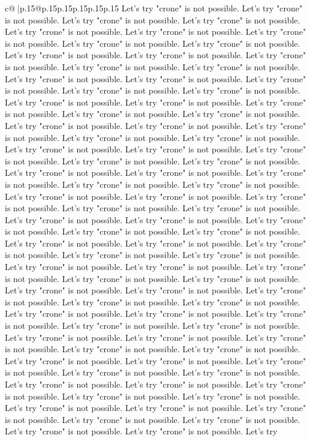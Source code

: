 \documentclass{article}
\begin{document}
{\begin{supertabular}{c@{$\;$}|p{.15\linewidth}@{}p{.15\linewidth}p{.15\linewidth}p{.15\linewidth}p{.15\linewidth}p{.15\linewidth}}
{{{Let's try "crone" is not possible. Let's try "crone" is not possible. Let's try "crone" is not possible. Let's try "crone" is not possible. Let's try "crone" is not possible. Let's try "crone" is not possible. Let's try "crone" is not possible. Let's try "crone" is not possible. Let's try "crone" is not possible. Let's try "crone" is not possible. Let's try "crone" is not possible. Let's try "crone" is not possible. Let's try "crone" is not possible. Let's try "crone" is not possible. Let's try "crone" is not possible. Let's try "crone" is not possible. Let's try "crone" is not possible. Let's try "crone" is not possible. Let's try "crone" is not possible. Let's try "crone" is not possible. Let's try "crone" is not possible. Let's try "crone" is not possible. Let's try "crone" is not possible. Let's try "crone" is not possible. Let's try "crone" is not possible. Let's try "crone" is not possible. Let's try "crone" is not possible. Let's try "crone" is not possible. Let's try "crone" is not possible. Let's try "crone" is not possible. Let's try "crone" is not possible. Let's try "crone" is not possible. Let's try "crone" is not possible. Let's try "crone" is not possible. Let's try "crone" is not possible. Let's try "crone" is not possible. Let's try "crone" is not possible. Let's try "crone" is not possible. Let's try "crone" is not possible. Let's try "crone" is not possible. Let's try "crone" is not possible. Let's try "crone" is not possible. Let's try "crone" is not possible. Let's try "crone" is not possible. Let's try "crone" is not possible. Let's try "crone" is not possible. Let's try "crone" is not possible. Let's try "crone" is not possible. Let's try "crone" is not possible. Let's try "crone" is not possible. Let's try "crone" is not possible. Let's try "crone" is not possible. Let's try "crone" is not possible. Let's try "crone" is not possible. Let's try "crone" is not possible. Let's try "crone" is not possible. Let's try "crone" is not possible. Let's try "crone" is not possible. Let's try "crone" is not possible. Let's try "crone" is not possible. Let's try "crone" is not possible. Let's try "crone" is not possible. Let's try "crone" is not possible. Let's try "crone" is not possible. Let's try "crone" is not possible. Let's try "crone" is not possible. Let's try "crone" is not possible. Let's try "crone" is not possible. Let's try "crone" is not possible. Let's try "crone" is not possible. Let's try "crone" is not possible. Let's try "crone" is not possible. Let's try "crone" is not possible. Let's try "crone" is not possible. Let's try "crone" is not possible. Let's try "crone" is not possible. Let's try "crone" is not possible. Let's try "crone" is not possible. Let's try "crone" is not possible. Let's try "crone" is not possible. Let's try "crone" is not possible. Let's try "crone" is not possible. Let's try "crone" is not possible. Let's try "crone" is not possible. Let's try "crone" is not possible. Let's try "crone" is not possible. Let's try "crone" is not possible. Let's try "crone" is not possible. Let's try "crone" is not possible. Let's try "crone" is not possible. Let's try "crone" is not possible. Let's try }}}
\end{supertabular}}
\end{document}
